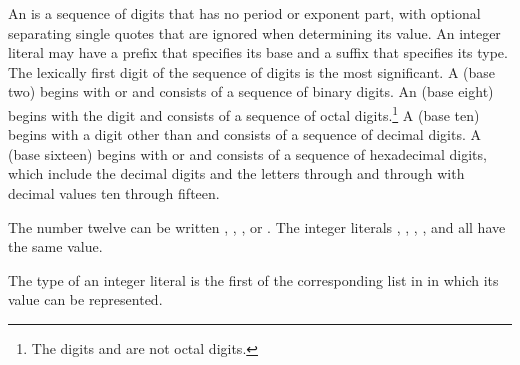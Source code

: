 \pnum
{}%
%
%
An  is a sequence of digits that has no period
or exponent part, with optional separating single quotes that are ignored
when determining its value. An integer literal may have a prefix that specifies
its base and a suffix that specifies its type. The lexically first digit
of the sequence of digits is the most significant.
A  (base two) begins with
 or  and consists of a sequence of binary digits.
An 
(base eight) begins with the digit  and consists of a
sequence of octal digits.\footnote{The digits  and  are not octal digits. }
A 
(base ten) begins with a digit other than  and
consists of a sequence of decimal digits.
A 
(base sixteen) begins with
 or  and consists of a sequence of hexadecimal
digits, which include the decimal digits and the letters 
through  and  through  with decimal values
ten through fifteen.
\begin{example} The number twelve can be written , ,
, or . The integer literals ,
, , , and
 all have the same value.
\end{example}

\pnum
{}%
%
%
%
%
%
%
%
The type of an integer literal is the first of the corresponding list
in  in which its value can be
represented.

